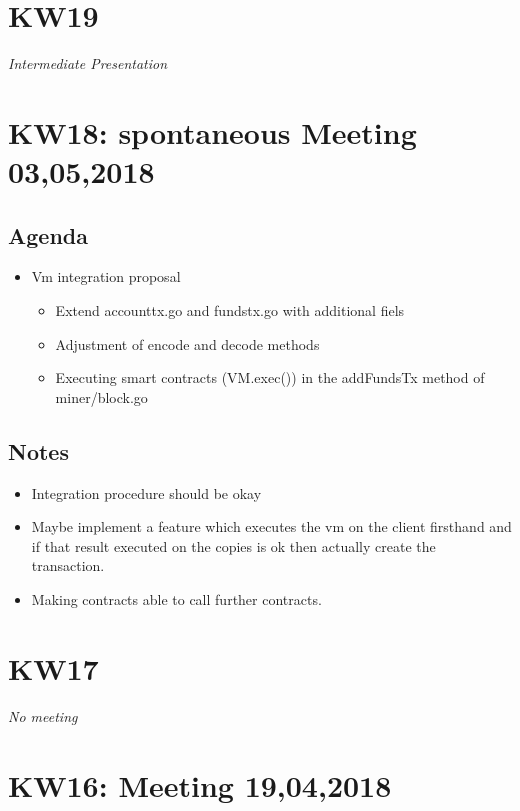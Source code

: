 \section{KW19}
\textit{Intermediate Presentation}

\section{KW18: spontaneous Meeting 03,05,2018}
\subsection{Agenda}
\begin{itemize}
\item
  Vm integration proposal

  \begin{itemize}
  \item
    Extend accounttx.go and fundstx.go with additional fiels
  \item
    Adjustment of encode and decode methods
  \item
    Executing smart contracts (VM.exec()) in the addFundsTx method of
    miner/block.go
  \end{itemize}
\end{itemize}

\subsection{Notes}
\begin{itemize}
\item
  Integration procedure should be okay
\item
  Maybe implement a feature which executes the vm on the client
  firsthand and if that result executed on the copies is ok then
  actually create the transaction.
\item
  Making contracts able to call further contracts.
\end{itemize}

\section{KW17}
\textit{No meeting}

\section{KW16: Meeting 19,04,2018}
